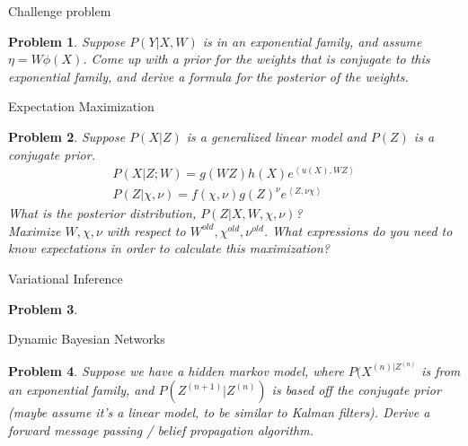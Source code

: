 \documentclass[a4paper]{article}
\newtheorem{problem}{Problem}[section]
\begin{document}
Challenge problem
\begin{problem}
  Suppose $P(Y \vert X, W)$ is in an exponential family, and assume $\eta = W \phi(X)$.  Come up with a prior for the weights that is conjugate to this exponential family, and derive a formula for the posterior of the weights.
\end{problem}

Expectation Maximization
\begin{problem}
  Suppose $P(X \vert Z)$ is a generalized linear model and $P(Z)$ is a conjugate prior.
\begin{equation}
  \begin{split}
    P( X \vert Z; W) = g( W Z ) h(X) e^{\left< u(X), W Z \right> } \\
    P( Z \vert \chi, \nu) = f(\chi,\nu) g(Z)^\nu e^{\left< Z, \nu \chi \right> }
  \end{split}
  \label{}
\end{equation}
What is the posterior distribution, $P(Z \vert X, W, \chi, \nu)$?  \\
Maximize $W,\chi,\nu$ with respect to $W^{old},\chi^{old},\nu^{old}$.  What expressions do you need to know expectations in order to calculate this maximization?
\end{problem}

Variational Inference
\begin{problem}

\end{problem}

Dynamic Bayesian Networks

\begin{problem}
  Suppose we have a hidden markov model, where $P(X^{(n) \vert Z^{(n)}}$ is from an exponential family, and $P( Z^{(n+1)} \vert Z^{(n)} )$ is based off the conjugate prior (maybe assume it's a linear model, to be similar to Kalman filters).  Derive a forward message passing / belief propagation algorithm.
\end{problem}
\end{document}
